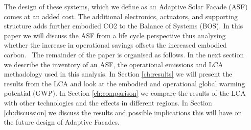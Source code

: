 The design of these systems, which we define as an Adaptive Solar Facade (ASF) comes at an added cost. The additional electronics, actuators, and supporting structure adds further embodied CO2 to the Balance of Systems (BOS). In this paper we will discuss the ASF from a life cycle perspective thus analysing whether the increase in operational savings offsets the increased embodied carbon. \
The remainder of the paper is organised as follows. In the next section we describe the inventory of an ASF, the operational emissions and LCA methadology used in this analysis. In Section \ref{ch:results} we will present the results from the LCA and look at the embodied and operational global warming potential (GWP). In Section \ref{ch:comparison} we compare the results of the LCA with other technologies and the effects in different regions. In Section \ref{ch:discussion} we discuss the results and possible implications this will have on the future design of Adaptive Facades. 















